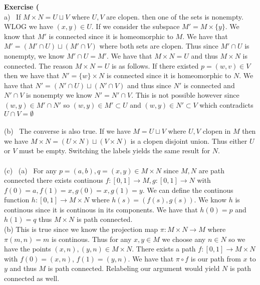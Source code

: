 \documentclass[12pt]{article}
\newenvironment{ques}[1]{\textbf{Exercise #1}\vspace{1 mm}\\ }{\bigskip}
\theoremstyle{definition}
\begin{document}
\begin{ques}{71}
	(a) \ If $M \times N = U \sqcup V$ where $U,V$ are clopen. then one of the
	sets is nonempty. WLOG we have $(x,y) \in U$. If we consider the subspace
	$M' = M \times \{y\}$. We know that $M'$ is connected since it is
	homeomorphic to $M$. We have that $M' = (M' \cap U) \sqcup (M' \cap V)$
	where both sets are clopen. Thus since $M' \cap U$ is nonempty, we know $M'
	\cap U = M'$. We have that $M \times N = U$ and thus $M \times N$ is
	connected. The reason $M \times N = U$ is as follows. If there existed
	$p = (w,v) \in V$ then we have that $N' = \{w\} \times N$ is connected
	since it is homeomorphic to $N$. We have that $N' = (N' \cap U) \sqcup (N'
	\cap V)$ and thus since $N'$ is connected and $N' \cap V$ is nonempty we
	know $N' = N' \cap V$. This is not possible however since $(w,y) \in M'
	\cap N'$ so $(w,y) \in M' \subset U$ and $(w,y) \in N' \subset V$ which
	contradicts $U \cap V = \emptyset$\\
	\\
	(b) \ The converse is also true. If we have $M = U \sqcup V$ where $U,V$
	clopen in $M$ then we have $M \times N = (U \times N) \sqcup (V \times N)$
	is a clopen disjoint union. Thus either $U$ or $V$ must be empty. Switching
	the labels yields the same result for $N$.\\
	\\
	(c) \ (a) \ For any $p = (a,b), q = (x,y) \in M \times N$ since $M,N$ are path
	connected there exists continous $f:[0,1] \to M, g:[0,1] \to N$ with $f(0)
	= a, f(1) = x, g(0) = x, g(1) = y$. We can define the continous function
	$h: [0,1] \to M \times N$ where $h(s) = (f(s), g(s))$. We know $h$ is
	continous since it is continous in its components. We have that $h(0) = p$
	and $h(1) = q$ thus $M \times N$ is path connected.\\
	(b) This is true since we know the projection map $\pi : M \times N \to
	M$ where $\pi(m,n) = m$ is continous. Thus for any $x, y \in
	M$ we choose any $n \in N$ so we have the points  $(x,n),(y,n) \in M \times
	N$. There exists a path $f: [0,1] \to M \times N$ with $f(0) = (x,n)$,
	$f(1) = (y,n)$. We have that $\pi \circ f$ is our path from $x$ to $y$ and
	thus $M$ is path connected. Relabeling our argument would yield $N$ is path
	connected as well.
\end{ques}
\end{document}
